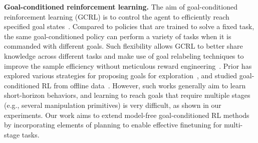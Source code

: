 
\textbf{Goal-conditioned reinforcement learning.} The aim of goal-conditioned reinforcement learning (GCRL) is to control the agent to efficiently reach specified goal states~\citep{Kaelbling1993LearningTA, Schaul2015UniversalVF, Eysenbach2021CLearningLT}. Compared to policies that are trained to solve a fixed task, the same goal-conditioned policy can perform a variety of tasks when it is commanded with different goals. Such flexibility allows GCRL to better share knowledge across different tasks and make use of goal relabeling techniques to improve the sample efficiency without meticulous reward engineering~\citep{Andrychowicz2017HindsightER, Pong2020SkewFitSS, Fang2019CurriculumguidedHE, Ding2019GoalconditionedIL, Gupta2019RelayPL, Sun2019PolicyCW, Eysenbach2020RewritingHW, Ghosh2021LearningTR}. Prior has explored various strategies for proposing goals for exploration~\citep{nair2018rig, Nair2019ContextualIG, Khazatsky2021WhatCI, ChaneSane2021GoalConditionedRL}, and studied goal-conditioned RL from offline data~\citep{chebotar2021actionable}. However, such works generally aim to learn short-horizon behaviors, and learning to reach goals that require multiple stages (e.g., several manipulation primitives) is very difficult, as shown in our experiments. Our work aims to extend model-free goal-conditioned RL methods by incorporating elements of planning to enable effective finetuning for multi-stage tasks.


